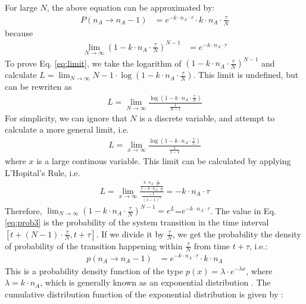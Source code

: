 \documentclass[12pt]{article}
\begin{document}
For large $N$, the above equation can be approximated by:
\begin{align}
P(n_A \rightarrow n_A-1) &= e^{-k \cdot n_A \cdot \tau} \cdot k \cdot n_A \cdot \frac \tau N
\label{eq:prob3}
\end{align}
because 
\begin{align}
\lim_{N \to \infty} (1-k \cdot n_A \cdot \frac {\tau} {N})^{N-1} &= e^{-k \cdot n_A \cdot \tau}
\label{eq:limit}
\end{align}
To prove Eq. \ref{eq:limit}, we take the logarithm of $(1-k \cdot n_A \cdot \frac {\tau} {N})^{N-1}$ and calculate $L=\lim_{N \to \infty} {N-1} \cdot \log (1-k \cdot n_A \cdot \frac {\tau} {N})$. This limit is undefined, but can be rewriten as 
\begin {align}
L=\lim_{N \to \infty} \frac {\log (1-k \cdot n_A \cdot \frac {\tau} {N})} {\frac 1 {N-1}}
\end{align}
For simplicity, we can ignore that $N$ is a discrete variable, and attempt to calculate a more general limit, i.e. 
\begin {align}
L=\lim_{x \to \infty} \frac {\log (1-k \cdot n_A \cdot \frac {\tau} {x})} {\frac 1 {x-1}}
\label{eq:lim3}
\end{align}
where $x$ is a large continous variable. This limit can be calculated by applying L'Hopital's Rule, i.e.
\begin {align}
L=\lim_{x \to \infty} \frac { \frac {k \cdot n_A \cdot \frac {\tau} {x^2}}{1-k \cdot n_A \cdot \frac {\tau} {x}}} {\frac {-1} {(x-1)^2}} = -k \cdot n_A \cdot  \tau
\label{eq:lim4}
\end{align}
Therefore, $\lim_{N \to \infty} (1-k \cdot n_A \cdot \frac {\tau} {N})^{N-1} = e^L$=$e^{-k \cdot n_A \cdot \tau}$. The value in Eq. \ref{eq:prob3} is the probability of the system transition in the time interval $[t+(N-1) \cdot \frac \tau N,t+\tau]$. If we divide it by $\frac\tau N$, we get the probability the density of probability of the transition happening within $\frac \tau N$ from time $t+\tau$, i.e.:
\begin{align}
p(n_A \rightarrow n_A-1) &= e^{-k \cdot n_A \cdot \tau} \cdot k \cdot n_A  
\label{eq:prob4}
\end{align}
This is a probability density function of the type $p(x) = \lambda \cdot e^{-\lambda x}$, where $\lambda = k \cdot n_A$, which is generally known as an exponential distribution \cite{introProb2005}. The cumulative distribution function of the exponential distribution is given by \cite{introProb2005}:
\end{document}
